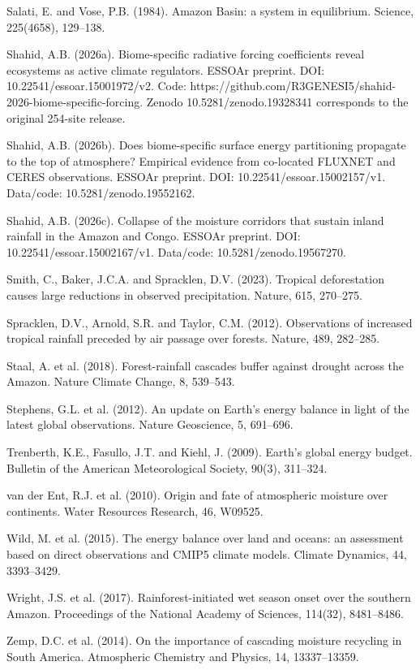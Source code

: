 Salati, E. and Vose, P.B. (1984). Amazon Basin: a system in equilibrium.
Science, 225(4658), 129--138.

Shahid, A.B. (2026a). Biome-specific radiative forcing coefficients
reveal ecosystems as active climate regulators. ESSOAr preprint. DOI:
10.22541/essoar.15001972/v2. Code:
https://github.com/R3GENESI5/shahid-2026-biome-specific-forcing.
Zenodo 10.5281/zenodo.19328341 corresponds to the original 254-site
release.

Shahid, A.B. (2026b). Does biome-specific surface energy partitioning
propagate to the top of atmosphere? Empirical evidence from co-located
FLUXNET and CERES observations. ESSOAr preprint. DOI:
10.22541/essoar.15002157/v1. Data/code: 10.5281/zenodo.19552162.

Shahid, A.B. (2026c). Collapse of the moisture corridors that sustain
inland rainfall in the Amazon and Congo. ESSOAr preprint. DOI:
10.22541/essoar.15002167/v1. Data/code: 10.5281/zenodo.19567270.

Smith, C., Baker, J.C.A. and Spracklen, D.V. (2023). Tropical
deforestation causes large reductions in observed precipitation. Nature,
615, 270--275.

Spracklen, D.V., Arnold, S.R. and Taylor, C.M. (2012). Observations of
increased tropical rainfall preceded by air passage over forests.
Nature, 489, 282--285.

Staal, A. et al. (2018). Forest-rainfall cascades buffer against drought
across the Amazon. Nature Climate Change, 8, 539--543.

Stephens, G.L. et al. (2012). An update on Earth's energy balance in
light of the latest global observations. Nature Geoscience, 5, 691--696.

Trenberth, K.E., Fasullo, J.T. and Kiehl, J. (2009). Earth's global
energy budget. Bulletin of the American Meteorological Society, 90(3),
311--324.

van der Ent, R.J. et al. (2010). Origin and fate of atmospheric moisture
over continents. Water Resources Research, 46, W09525.

Wild, M. et al. (2015). The energy balance over land and oceans: an
assessment based on direct observations and CMIP5 climate models.
Climate Dynamics, 44, 3393--3429.

Wright, J.S. et al. (2017). Rainforest-initiated wet season onset over
the southern Amazon. Proceedings of the National Academy of Sciences,
114(32), 8481--8486.

Zemp, D.C. et al. (2014). On the importance of cascading moisture
recycling in South America. Atmospheric Chemistry and Physics, 14,
13337--13359.



